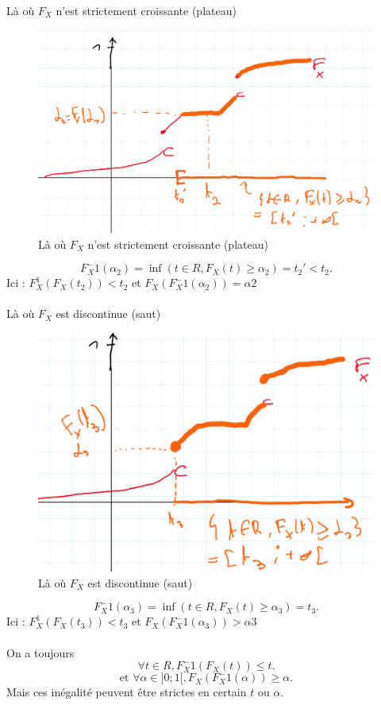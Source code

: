 \documentclass{article}
\theoremstyle{plain}%
\theoremstyle{definition}
\theoremstyle{remark}
\begin{document}
    Là où $ F_X $ n'est strictement croissante (plateau)
    \begin{figure}[!htbp]
        \centering
        \includegraphics[width=.75\textwidth]{figures/figure2.png}
        \caption{Là où $ F_X $ n'est strictement croissante (plateau)}
        \label{}
    \end{figure}
    \[
        F_X^-1 (\alpha _2) = \inf ({t \in R, F_X(t) \geq \alpha _2}) = t_2' < t_2
    .\]
    Ici : $ F_X^1 (F_X(t_2)) < t_2$ et $ F_X(F_X^-1(\alpha _2)) = \alpha 2$  \\\\


    Là où $ F_X $ est discontinue (saut)
    \begin{figure}[!htbp]
        \centering
        \includegraphics[width=.75\textwidth]{figures/figure3.png}
        \caption{Là où $ F_X $ est discontinue (saut)}
        \label{}
    \end{figure}
    \[
        F_X^-1 (\alpha _3) = \inf ({t \in R, F_X(t) \geq \alpha _3}) = t_3
    .\]
    Ici : $ F_X^1 (F_X(t_3)) < t_3 $ et $ F_X(F_X^-1(\alpha _3)) > \alpha 3$  \\\\
    
    On a toujours 
    \[
        \forall t \in R, F_X^-1(F_X(t)) \leq t 
    .\]
    \[
        \text{et } \forall \alpha \in ]0;1[, F_X(F_X^-1 (\alpha )) \geq \alpha 
    .\]
    Mais ces inégalité peuvent être strictes en certain $ t $ ou $ \alpha  $. \\\\
\end{document}
